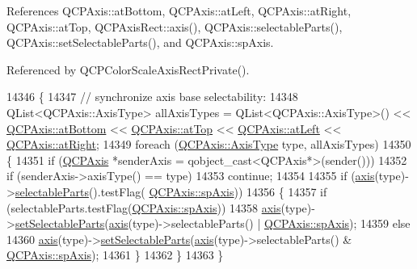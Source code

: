References Q\+C\+P\+Axis\+::at\+Bottom, Q\+C\+P\+Axis\+::at\+Left, Q\+C\+P\+Axis\+::at\+Right, Q\+C\+P\+Axis\+::at\+Top, Q\+C\+P\+Axis\+Rect\+::axis(), Q\+C\+P\+Axis\+::selectable\+Parts(), Q\+C\+P\+Axis\+::set\+Selectable\+Parts(), and Q\+C\+P\+Axis\+::sp\+Axis.



Referenced by Q\+C\+P\+Color\+Scale\+Axis\+Rect\+Private().


\begin{DoxyCode}
14346 \{
14347   \textcolor{comment}{// synchronize axis base selectability:}
14348   QList<QCPAxis::AxisType> allAxisTypes = QList<QCPAxis::AxisType>() << 
      \hyperlink{class_q_c_p_axis_ae2bcc1728b382f10f064612b368bc18aa220d68888516b6c3b493d144f1ba438f}{QCPAxis::atBottom} << \hyperlink{class_q_c_p_axis_ae2bcc1728b382f10f064612b368bc18aac0ece2b680d3f545e701f75af1655977}{QCPAxis::atTop} << 
      \hyperlink{class_q_c_p_axis_ae2bcc1728b382f10f064612b368bc18aaf84aa6cac6fb6099f54a2cbf7546b730}{QCPAxis::atLeft} << \hyperlink{class_q_c_p_axis_ae2bcc1728b382f10f064612b368bc18aadf5509f7d29199ef2f263b1dd224b345}{QCPAxis::atRight};
14349   \textcolor{keywordflow}{foreach} (\hyperlink{class_q_c_p_axis_ae2bcc1728b382f10f064612b368bc18a}{QCPAxis::AxisType} type, allAxisTypes)
14350   \{
14351     \textcolor{keywordflow}{if} (\hyperlink{class_q_c_p_axis}{QCPAxis} *senderAxis = qobject\_cast<QCPAxis*>(sender()))
14352       \textcolor{keywordflow}{if} (senderAxis->axisType() == type)
14353         \textcolor{keywordflow}{continue};
14354     
14355     \textcolor{keywordflow}{if} (\hyperlink{class_q_c_p_axis_rect_a560de44e47a4af0f86c59102a094b1e4}{axis}(type)->\hyperlink{class_q_c_p_axis_ad2bff3d2ed3d35c10d44c0c02441bd2c}{selectableParts}().testFlag(
      \hyperlink{class_q_c_p_axis_abee4c7a54c468b1385dfce2c898b115fa8949d2c1a31eccae9be7ed32e7a1ae38}{QCPAxis::spAxis}))
14356     \{
14357       \textcolor{keywordflow}{if} (selectableParts.testFlag(\hyperlink{class_q_c_p_axis_abee4c7a54c468b1385dfce2c898b115fa8949d2c1a31eccae9be7ed32e7a1ae38}{QCPAxis::spAxis}))
14358         \hyperlink{class_q_c_p_axis_rect_a560de44e47a4af0f86c59102a094b1e4}{axis}(type)->\hyperlink{class_q_c_p_axis_a513f9b9e326c505d9bec54880031b085}{setSelectableParts}(\hyperlink{class_q_c_p_axis_rect_a560de44e47a4af0f86c59102a094b1e4}{axis}(type)->selectableParts() | 
      \hyperlink{class_q_c_p_axis_abee4c7a54c468b1385dfce2c898b115fa8949d2c1a31eccae9be7ed32e7a1ae38}{QCPAxis::spAxis});
14359       \textcolor{keywordflow}{else}
14360         \hyperlink{class_q_c_p_axis_rect_a560de44e47a4af0f86c59102a094b1e4}{axis}(type)->\hyperlink{class_q_c_p_axis_a513f9b9e326c505d9bec54880031b085}{setSelectableParts}(\hyperlink{class_q_c_p_axis_rect_a560de44e47a4af0f86c59102a094b1e4}{axis}(type)->selectableParts() & ~
      \hyperlink{class_q_c_p_axis_abee4c7a54c468b1385dfce2c898b115fa8949d2c1a31eccae9be7ed32e7a1ae38}{QCPAxis::spAxis});
14361     \}
14362   \}
14363 \}
\end{DoxyCode}



